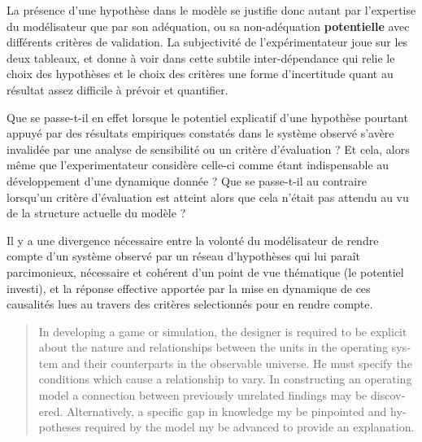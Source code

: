 
La présence d'une hypothèse dans le modèle se justifie donc autant par l'expertise du modélisateur que par son adéquation, ou sa non-adéquation \textbf{potentielle} avec différents critères de validation. La subjectivité de l'expérimentateur joue sur les deux tableaux, et donne à voir dans cette subtile inter-dépendance qui relie le choix des hypothèses et le choix des critères une forme d'incertitude quant au résultat assez difficile à prévoir et quantifier.

Que se passe-t-il en effet lorsque le potentiel explicatif d'une hypothèse pourtant appuyé par des résultats empiriques constatés dans le système observé s'avère invalidée par une analyse de sensibilité ou un critère d'évaluation ? Et cela, alors même que l'experimentateur considère celle-ci comme étant indispensable au développement d'une dynamique donnée ? Que se passe-t-il au contraire lorsqu'un critère d'évaluation est atteint alors que cela n'était pas attendu au vu de la structure actuelle du modèle ? 


Il y a une divergence nécessaire entre la volonté du modélisateur de rendre compte d'un système observé par un réseau d'hypothèses qui lui paraît parcimonieux, nécessaire et cohérent d'un point de vue thématique (le potentiel investi), et la réponse effective apportée par la mise en dynamique de ces causalités lues au travers des critères selectionnés pour en rendre compte. %

\foreignblockquote{english}[{\cite[219]{Hermann1967}}]{In developing a game or simulation, the designer is required to be explicit about the nature and relationships between the units in the operating system and their counterparts in the observable universe. He must specify the conditions which cause a relationship to vary. In constructing an operating model a connection between previously unrelated findings may be discovered. Alternatively, a specific gap in knowledge my be pinpointed and hypotheses required by the model my be advanced to provide an explanation.} 

